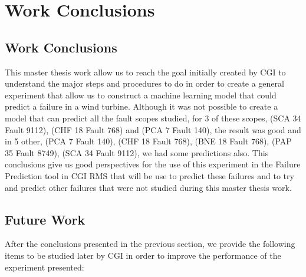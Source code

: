 

\chapter{Work Conclusions}
\label{cha:Work Conclusions}

\section{Work Conclusions}
\label{sub:Work Conclusions/Work Conclusions}
This master thesis work allow us to reach the goal initially created by CGI to understand the major steps and procedures to do in order to create a general experiment that allow us to construct a machine learning model that could predict a failure in a wind turbine. Although it was not possible to create a model that can predict all the fault scopes studied, for 3 of these scopes, (SCA 34 Fault 9112), (CHF 18 Fault 768) and (PCA 7 Fault 140), the result was good and in 5 other, (PCA 7 Fault 140), (CHF 18 Fault 768), (BNE 18 Fault 768), (PAP 35 Fault 8749), (SCA 34 Fault 9112), we had some predictions also. This conclusions give us good perspectives for the use of this experiment in the Failure Prediction tool in CGI RMS that will be use to predict these failures and to try and predict other failures that were not studied during this master thesis work.

\section{Future Work}
\label{sub:Work Conclusions/Future Work}
After the conclusions presented in the previous section, we provide the following items to be studied later by CGI in order to improve the performance of the experiment presented:

